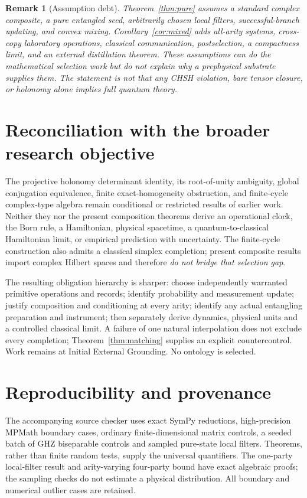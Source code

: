 \documentclass[10pt,letterpaper]{article}
\newtheorem{remark}[theorem]{Remark}
\begin{document}
\begin{remark}[Assumption debt]
Theorem~\ref{thm:pure} assumes a standard complex composite, a pure
entangled seed, arbitrarily chosen local filters, successful-branch
updating, and convex mixing. Corollary~\ref{cor:mixed} adds all-arity
systems, cross-copy laboratory operations, classical communication,
postselection, a compactness limit, and an external distillation theorem.
These assumptions can do the mathematical selection work but do not explain
why a prephysical substrate supplies them. The statement is \emph{not}
that any CHSH violation, bare tensor closure, or holonomy alone implies
full quantum theory.
\end{remark}

\section{Reconciliation with the broader research objective}
The projective holonomy determinant identity, its root-of-unity ambiguity,
global conjugation equivalence, finite exact-homogeneity obstruction,
and finite-cycle complex-type algebra remain conditional or restricted
results of earlier work. Neither they nor the present composition theorems
derive an operational clock, the Born rule, a Hamiltonian, physical
spacetime, a quantum-to-classical Hamiltonian limit, or empirical
prediction with uncertainty. The finite-cycle construction also admits a
classical simplex completion; present composite results import complex
Hilbert spaces and therefore \emph{do not bridge that selection gap}.

The resulting obligation hierarchy is sharper: choose independently
warranted primitive operations and records; identify probability and
measurement update; justify composition and conditioning at every arity;
identify any actual entangling preparation and instrument; then separately
derive dynamics, physical units and a controlled classical limit. A
failure of one natural interpolation does not exclude every completion;
Theorem~\ref{thm:matching} supplies an explicit countercontrol. Work
remains at Initial External Grounding. No ontology is selected.

\section*{Reproducibility and provenance}
The accompanying source checker uses exact SymPy reductions, high-precision
MPMath boundary cases, ordinary finite-dimensional matrix controls, a
seeded batch of GHZ biseparable controls and sampled pure-state local
filters. Theorems, rather than finite random tests, supply the universal
quantifiers. The one-party local-filter result and arity-varying four-party
bound have exact algebraic proofs; the sampling checks do not estimate a
physical distribution. All boundary and numerical outlier cases are retained.
\end{document}
